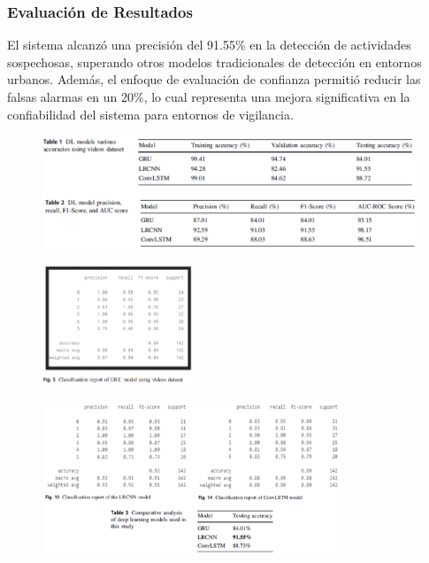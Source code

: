 \clearpage


\subsubsection{Evaluación de Resultados}
El sistema alcanzó una precisión del 91.55\% en la detección de actividades sospechosas, superando otros modelos tradicionales de detección en entornos urbanos. Además, el enfoque de evaluación de confianza permitió reducir las falsas alarmas en un 20\%, lo cual representa una mejora significativa en la confiabilidad del sistema para entornos de vigilancia.

\begin{figure}[h] %
    \centering
    \includegraphics[width=1.0\textwidth]{4/entre 3.1.png} %
    \label{fig:ejemplo} %
\end{figure}

\begin{figure}[h] %
    \centering
    \includegraphics[width=0.4\textwidth]{4/entre 3.2.png} %
    \label{fig:ejemplo} %
\end{figure}

\begin{figure}[h] %
    \centering
    \includegraphics[width=0.8\textwidth]{4/entre 3.3.png} %
    \label{fig:ejemplo} %
\end{figure}



